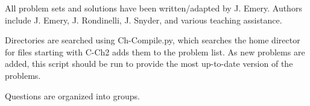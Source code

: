 \documentclass[answers,11pt,oneside,addpoints]{exam}   %
\begin{document}
			
	\textcolor{NUpurp120}{\LARGE{}} %
	\vspace{0.25em}

\textcolor{NUpurp120}{\NUBrandTwo%
} 
\newline %

All problem sets and solutions have been written/adapted by J. Emery. Authors include J. Emery, J. Rondinelli, J. Snyder, and various teaching assistance.

Directories are searched using Ch\*-Compile.py, which searches the home director for files starting with C-Ch2 adds them to the problem list. As new problems are added, this script should be run to provide the most up-to-date version of the problems.

\large{\NUBrand{\textcolor{DRed}{The problems below are updated as of: \today, at\, \currenttime}}}

Questions are organized into groups.

\newpage
\begin{questions}
\end{questions}
\end{document}
